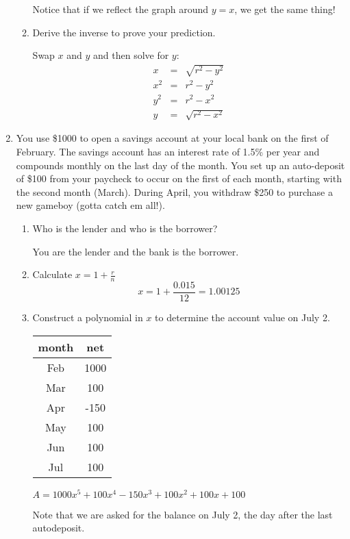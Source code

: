 \documentclass[letterpaper,12pt,fleqn]{article}
\begin{document}
\begin{enumerate}
\begin{enumerate}
    Notice that if we reflect the graph around $y=x$, we get the same thing!

  \item Derive the inverse to prove your prediction.

    Swap $x$ and $y$ and then solve for $y$:
    \begin{eqnarray*}
      x &=& \sqrt{r^2-y^2} \\
      x^2 &=& r^2-y^2 \\
      y^2 &=& r^2-x^2 \\
      y &=& \sqrt{r^2-x^2}
    \end{eqnarray*}
  \end{enumerate}
  
\item You use \$1000 to open a savings account at your local bank on the first
  of February. The savings account has an interest rate of 1.5\% per year and
  compounds monthly on the last day of the month. You set up an auto-deposit
  of \$100 from your paycheck to occur on the first of each month, starting
  with the second month (March).  During April, you withdraw \$250 to
  purchase a new gameboy (gotta catch em all!).
  \begin{enumerate}
  \item Who is the lender and who is the borrower?

    You are the lender and the bank is the borrower.
    
  \item Calculate $x=1+\frac{r}{n}$
    \[x=1+\frac{0.015}{12}=1.00125\]
    
  \item Construct a polynomial in $x$ to determine the account value on
    July 2.

    \begin{tabular}{c|c}
      month & net \\
      \hline
      Feb & 1000 \\
      Mar & 100 \\
      Apr & -150 \\
      May & 100 \\
      Jun & 100 \\
      Jul & 100 \\
    \end{tabular}

    $A=1000x^5+100x^4-150x^3+100x^2+100x+100$

    Note that we are asked for the balance on July 2, the day after the last
    autodeposit.
    

\end{enumerate}
\end{enumerate}
\end{document}
